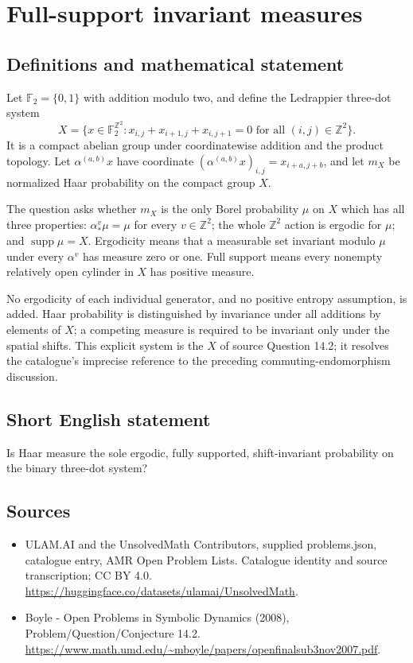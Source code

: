 \documentclass[11pt,a4paper]{article}
\begin{document}
\section*{Full-support invariant measures}\label{statement}

\subsection{Definitions and mathematical statement}
Let $\mathbb F_2=\{0,1\}$ with addition modulo two, and define the
Ledrappier three-dot system
\[
 X=\{x\in\mathbb F_2^{\mathbb Z^2}:
       x_{i,j}+x_{i+1,j}+x_{i,j+1}=0
       \text{ for all }(i,j)\in\mathbb Z^2\}.
\]
It is a compact abelian group under coordinatewise addition and the
product topology. Let $\alpha^{(a,b)}x$ have coordinate
$(\alpha^{(a,b)}x)_{i,j}=x_{i+a,j+b}$, and let $m_X$ be normalized Haar
probability on the compact group $X$.

The question asks whether $m_X$ is the only Borel probability $\mu$ on
$X$ which has all three properties: $\alpha^v_*\mu=\mu$ for every
$v\in\mathbb Z^2$; the whole $\mathbb Z^2$ action is ergodic for $\mu$;
and $\operatorname{supp}\mu=X$. Ergodicity means that a measurable set
invariant modulo $\mu$ under every $\alpha^v$ has measure zero or one.
Full support means every nonempty relatively open cylinder in $X$ has
positive measure.

No ergodicity of each individual generator, and no positive entropy
assumption, is added. Haar probability is distinguished by invariance
under all additions by elements of $X$; a competing measure is required
to be invariant only under the spatial shifts. This explicit system is
the $X$ of source Question 14.2; it resolves the catalogue's imprecise
reference to the preceding commuting-endomorphism discussion.
\subsection{Short English statement}
Is Haar measure the sole ergodic, fully supported, shift-invariant probability on the binary three-dot system?
\subsection{Sources}
\begin{itemize}
\item[S1] ULAM.AI and the UnsolvedMath Contributors, supplied problems.json, catalogue entry, AMR Open Problem Lists. Catalogue identity and source transcription; CC BY 4.0.
\url{https://huggingface.co/datasets/ulamai/UnsolvedMath}.
\item[S2] Boyle - Open Problems in Symbolic Dynamics (2008), Problem/Question/Conjecture 14.2. 
\url{https://www.math.umd.edu/~mboyle/papers/openfinalsub3nov2007.pdf}.
\end{itemize}
\end{document}

